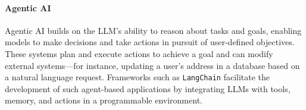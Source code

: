 \paragraph*{Agentic AI}
Agentic AI builds on the LLM's ability to reason about tasks and goals, enabling models to make decisions and take actions in pursuit of user-defined objectives. 
These systems plan and execute actions to achieve a goal and can modify external systems—for instance, updating a user's address in a database based on a natural language request.
Frameworks such as \texttt{LangChain} facilitate the development of such agent-based applications by integrating LLMs with tools, memory, and actions in a programmable environment.